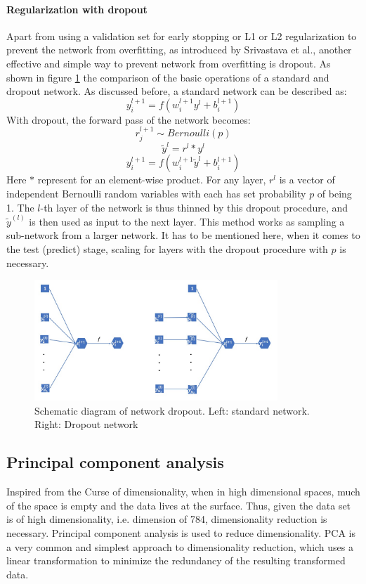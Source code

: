 \documentclass[conference]{IEEEtran}
\begin{document}
\paragraph{Regularization with dropout} 
Apart from using a validation set for early stopping or L1 or L2 regularization to prevent the network from overfitting, as introduced by Srivastava et al., another effective and simple way to prevent network from overfitting is dropout\cite{b4}. As shown in figure \ref{Dropout} the comparison of the basic operations of a standard and dropout network. As discussed before, a standard network can be described as:
$$y_i^{l+1} = f(w_i^{l+1}y^l+b_i^{l+1})$$
With dropout, the forward pass of the network becomes:
$$r_j^{l+1}\sim Bernoulli(p)$$
$$\tilde{y}^{l} = r^{l} * y^{l}$$
$$y_i^{l+1} = f(w_i^{l+1}\tilde{y}^{l}+b_i^{l+1})$$
Here $*$ represent for an element-wise product. For any layer, $r^l$ is a vector of independent Bernoulli random variables with each has set probability $p$ of being 1. The $l$-th layer of the network is thus thinned by this dropout procedure, and $\tilde{y}^{(l)}$ is then used as input to the next layer. This method works as sampling a sub-network from a larger network. It has to be mentioned here, when it comes to the test (predict) stage, scaling for layers with the dropout procedure with $p$ is necessary.
\begin{figure}[htbp]
\centerline{\includegraphics[width=3.6in]{dropout.jpg}}
\caption{Schematic diagram of network dropout. Left: standard network. Right: Dropout network}
\label{Dropout}
\end{figure}


\subsection{Principal component analysis} Inspired from the Curse of dimensionality, when in high dimensional spaces, much of the space is empty and the data lives at the surface. Thus, given the data set is of high dimensionality, i.e. dimension of 784, dimensionality reduction is necessary. Principal component analysis is used to reduce dimensionality. PCA is a very common and simplest approach to dimensionality reduction, which uses a linear transformation to minimize the redundancy of the resulting transformed data.
	
\end{document}
